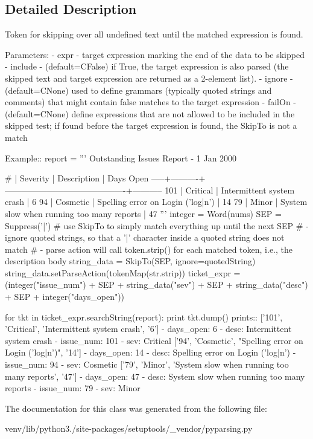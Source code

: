 \subsection{Detailed Description}
\begin{DoxyVerb}Token for skipping over all undefined text until the matched expression is found.

Parameters:
 - expr - target expression marking the end of the data to be skipped
 - include - (default=C{False}) if True, the target expression is also parsed 
      (the skipped text and target expression are returned as a 2-element list).
 - ignore - (default=C{None}) used to define grammars (typically quoted strings and 
      comments) that might contain false matches to the target expression
 - failOn - (default=C{None}) define expressions that are not allowed to be 
      included in the skipped test; if found before the target expression is found, 
      the SkipTo is not a match

Example::
    report = '''
        Outstanding Issues Report - 1 Jan 2000

           # | Severity | Description                               |  Days Open
        -----+----------+-------------------------------------------+-----------
         101 | Critical | Intermittent system crash                 |          6
          94 | Cosmetic | Spelling error on Login ('log|n')         |         14
          79 | Minor    | System slow when running too many reports |         47
        '''
    integer = Word(nums)
    SEP = Suppress('|')
    # use SkipTo to simply match everything up until the next SEP
    # - ignore quoted strings, so that a '|' character inside a quoted string does not match
    # - parse action will call token.strip() for each matched token, i.e., the description body
    string_data = SkipTo(SEP, ignore=quotedString)
    string_data.setParseAction(tokenMap(str.strip))
    ticket_expr = (integer("issue_num") + SEP 
                  + string_data("sev") + SEP 
                  + string_data("desc") + SEP 
                  + integer("days_open"))
    
    for tkt in ticket_expr.searchString(report):
        print tkt.dump()
prints::
    ['101', 'Critical', 'Intermittent system crash', '6']
    - days_open: 6
    - desc: Intermittent system crash
    - issue_num: 101
    - sev: Critical
    ['94', 'Cosmetic', "Spelling error on Login ('log|n')", '14']
    - days_open: 14
    - desc: Spelling error on Login ('log|n')
    - issue_num: 94
    - sev: Cosmetic
    ['79', 'Minor', 'System slow when running too many reports', '47']
    - days_open: 47
    - desc: System slow when running too many reports
    - issue_num: 79
    - sev: Minor
\end{DoxyVerb}
 

The documentation for this class was generated from the following file\+:\begin{DoxyCompactItemize}
\item 
venv/lib/python3./site-\/packages/setuptools/\+\_\+vendor/pyparsing.\+py\end{DoxyCompactItemize}
